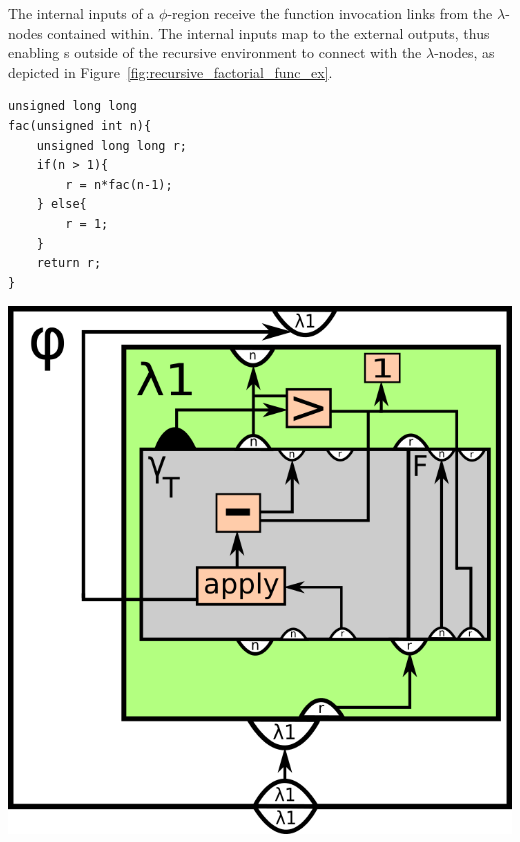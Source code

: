 \begin{itemize}
The internal inputs of a $\phi$-region  receive the function invocation links from the $\lambda$-nodes
contained within. The internal inputs map to the external outputs, thus enabling
\applyNode s outside of the recursive environment to connect with the
$\lambda$-nodes, as depicted in Figure~\ref{fig:recursive_factorial_func_ex}.

\begin{centering}
	\noindent\begin{minipage}{0.37\textwidth}
		\begin{CenteredBox}
		\begin{lstlisting}[label={lst:recursive_factorial_func_ex},
style=minipage_customcpp]
unsigned long long
fac(unsigned int n){
	unsigned long long r;
	if(n > 1){
		r = n*fac(n-1);
	} else{
		r = 1;
	}
	return r;
}
		\end{lstlisting}
		\end{CenteredBox}
	\end{minipage}
	\noindent\begin{minipage}{0.55\textwidth}
		\captionsetup{type=figure}
		\includegraphics[width=\textwidth]{figures/recursive_factorial_func_ex}
	\end{minipage}
	\label{fig:recursive_factorial_func_ex}
\end{centering}

\end{itemize}
